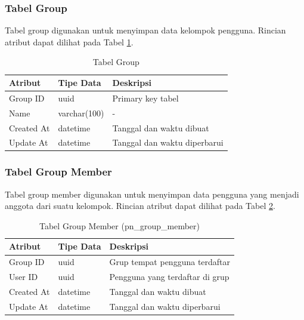\subsubsection{Tabel Group}
\par Tabel group digunakan untuk menyimpan data kelompok pengguna. Rincian atribut dapat dilihat pada Tabel \ref{tabel_group}.
\begin{longtable}{|p{2cm}|p{2.5cm}|p{4.5cm}|}
	\caption{Tabel Group} \label{tabel_group} \\ \hline
    \textbf{Atribut} & \textbf{Tipe Data} & \textbf{Deskripsi} \\ \hline
    Group ID & uuid & Primary key tabel \\ \hline
    Name & varchar(100) & - \\ \hline
    Created At & datetime & Tanggal dan waktu dibuat \\ \hline
    Update At & datetime & Tanggal dan waktu diperbarui \\ \hline
\end{longtable}

\subsubsection{Tabel Group Member}
\par Tabel group member digunakan untuk menyimpan data pengguna yang menjadi anggota dari suatu kelompok. Rincian atribut dapat dilihat pada Tabel \ref{tabel_group_member}.
\begin{longtable}{|p{2cm}|p{2.5cm}|p{4.5cm}|}
	\caption{Tabel Group Member (pn\_group\_member)} \label{tabel_group_member} \\ \hline
    \textbf{Atribut} & \textbf{Tipe Data} & \textbf{Deskripsi} \\ \hline
    Group ID & uuid & Grup tempat pengguna terdaftar \\ \hline
    User ID & uuid & Pengguna yang terdaftar di grup \\ \hline
    Created At & datetime & Tanggal dan waktu dibuat \\ \hline
    Update At & datetime & Tanggal dan waktu diperbarui \\ \hline
\end{longtable}

